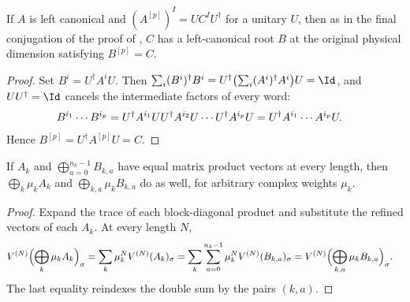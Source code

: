 \begin{lemma}
    \label{thm:periodic_unitary_blocked_root}
    \leanok
    If $A$ is left canonical and $(A^{[p]})^I=UC^IU^\dagger$ for a
    unitary $U$, then as in the final conjugation of the proof of
    \cite[Theorem~4.1]{DeLasCuevas2017Irreducible}, $C$ has a left-canonical
    root $B$ at the original physical dimension satisfying $B^{[p]}=C$.
\end{lemma}

\begin{proof}
    \leanok
    Set $B^i=U^\dagger A^iU$. Then
    $\sum_i(B^i)^\dagger B^i=U^\dagger\bigl(\sum_i(A^i)^\dagger A^i\bigr)U=\Id$, and
    $UU^\dagger=\Id$ cancels the intermediate factors of every word:
    \begin{align}
        B^{i_1}\cdots B^{i_p} & =U^\dagger A^{i_1}UU^\dagger A^{i_2}U\cdots U^\dagger A^{i_p}U
        =U^\dagger A^{i_1}\cdots A^{i_p}U. \notag
    \end{align}
    Hence $B^{[p]}=U^\dagger A^{[p]}U=C$.
\end{proof}

\begin{lemma}
    \label{thm:periodic_weighted_block_refinement}
    \leanok
    If $A_k$ and $\bigoplus_{a=0}^{n_k-1}B_{k,a}$ have equal matrix product
    vectors at every length, then $\bigoplus_k\mu_k A_k$ and
    $\bigoplus_{k,a}\mu_k B_{k,a}$ do as well, for arbitrary complex
    weights $\mu_k$.
\end{lemma}

\begin{proof}
    \leanok
    Expand the trace of each block-diagonal product and substitute the
    refined vectors of each $A_k$. At every length $N$,
    \begin{align}
        V^{(N)}\Bigl(\bigoplus_k\mu_kA_k\Bigr)_\sigma
         & =\sum_k\mu_k^NV^{(N)}(A_k)_\sigma
        =\sum_k\sum_{a=0}^{n_k-1}\mu_k^NV^{(N)}(B_{k,a})_\sigma
        =V^{(N)}\Bigl(\bigoplus_{k,a}\mu_kB_{k,a}\Bigr)_\sigma. \notag
    \end{align}
    The last equality reindexes the double sum by the pairs $(k,a)$.
\end{proof}

